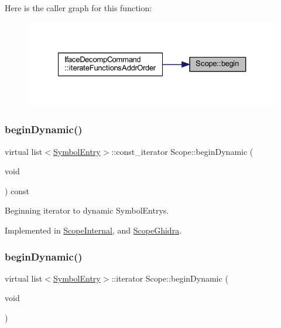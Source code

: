 Here is the caller graph for this function\+:
\nopagebreak
\begin{figure}[H]
\begin{center}
\leavevmode
\includegraphics[width=327pt]{class_scope_a054e7b7c470035be94e1e4229ff188d4_icgraph}
\end{center}
\end{figure}
\mbox{\label{class_scope_aab0f92c9d85a20b77b562e5a499b9e6d}} 
\subsubsection{\texorpdfstring{beginDynamic()}{beginDynamic()}\hspace{0.1cm}{\footnotesize\ttfamily [1/2]}}
{\footnotesize\ttfamily virtual list$<$\mbox{\hyperlink{class_symbol_entry}{Symbol\+Entry}}$>$\+::const\+\_\+iterator Scope\+::begin\+Dynamic (\begin{DoxyParamCaption}\item[{void}]{ }\end{DoxyParamCaption}) const\hspace{0.3cm}{\ttfamily [pure virtual]}}



Beginning iterator to dynamic Symbol\+Entrys. 



Implemented in \mbox{\hyperlink{class_scope_internal_a3e1111265c90754ecafd2331f9c7a684}{Scope\+Internal}}, and \mbox{\hyperlink{class_scope_ghidra_a4f5b42e5c99ea0581c4819b550c2fc27}{Scope\+Ghidra}}.

\mbox{\label{class_scope_a883ad2607f2c7859b49b45100c2c0011}} 
\subsubsection{\texorpdfstring{beginDynamic()}{beginDynamic()}\hspace{0.1cm}{\footnotesize\ttfamily [2/2]}}
{\footnotesize\ttfamily virtual list$<$\mbox{\hyperlink{class_symbol_entry}{Symbol\+Entry}}$>$\+::iterator Scope\+::begin\+Dynamic (\begin{DoxyParamCaption}\item[{void}]{ }\end{DoxyParamCaption})\hspace{0.3cm}{\ttfamily [pure virtual]}}



